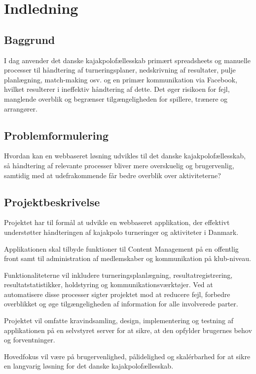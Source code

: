 \section{Indledning}
\subsection{Baggrund}

I dag anvender det danske kajakpolofællesskab primært spreadsheets og manuelle processer til håndtering af
turneringsplaner, nedskrivning af resultater, pulje planlægning, match-making osv. og en primær
kommunikation via Facebook, hvilket resulterer i ineffektiv håndtering af dette. Det øger risikoen
for fejl, manglende overblik og begrænser tilgængeligheden for spillere, trænere og arrangører.

\subsection{Problemformulering}

Hvordan kan en webbaseret løsning udvikles til det danske kajakpolofællesskab, så håndtering af relevante processer
bliver mere overskuelig og brugervenlig, samtidig med at udefrakommende får bedre overblik over aktiviteterne?

\subsection{Projektbeskrivelse}

Projektet har til formål at udvikle en webbaseret applikation, der effektivt understøtter
håndteringen af kajakpolo turneringer og aktiviteter i Danmark.

Applikationen skal tilbyde funktioner til Content Management på en offentlig front samt til administration af
medlemskaber og kommunikation på klub-niveau.

Funktionaliteterne vil inkludere turneringsplanlægning, resultatregistrering, resultatstatistikker, holdstyring og
kommunikationsværktøjer.
Ved at automatisere disse processer sigter projektet mod at reducere fejl, forbedre overblikket og øge tilgængeligheden
af information for alle involverede parter.

Projektet vil omfatte kravindsamling, design, implementering og testning af applikationen på en selvstyret server for
at sikre, at den opfylder brugernes behov og forventninger.

Hovedfokus vil være på brugervenlighed, pålidelighed og skalérbarhed for at sikre en langvarig løsning for det danske
kajakpolofællesskab.



